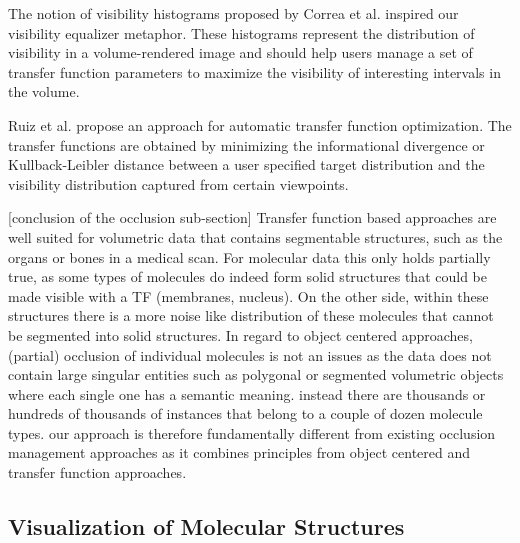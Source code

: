  The notion of visibility histograms proposed by Correa et al. inspired our visibility equalizer metaphor. These histograms represent the distribution of visibility in a volume-rendered image and should help users manage a set of transfer function parameters to maximize the visibility of interesting intervals in the volume.

Ruiz et al. propose an approach for automatic transfer function optimization. The transfer functions are obtained by minimizing the informational divergence or Kullback-Leibler distance between a user specified target distribution and the visibility distribution captured from certain viewpoints. 



[conclusion of the occlusion sub-section]
Transfer function based approaches are well suited for volumetric data that contains segmentable structures, such as the organs or bones in a medical scan. For molecular data this only holds partially true, as some types of molecules do indeed form solid structures that could be made visible with a TF (membranes, nucleus). 	On the other side, within these structures there is a more noise like distribution of these molecules that cannot be segmented into solid structures. 
In regard to object centered approaches, (partial) occlusion of individual molecules is not an issues as the data does not contain large singular entities such as polygonal or segmented volumetric objects where each single one has a semantic meaning. instead there are thousands or hundreds of thousands of instances that belong to a couple of dozen molecule types.
 our approach is therefore fundamentally different from existing occlusion management approaches as it combines principles from object centered and transfer function approaches. 


\subsection{Visualization of Molecular Structures}

	
\cite{Viola05}
\cite{Burns07}
\cite{Burns08}
\cite{Li07}
\cite{Lidal12}

